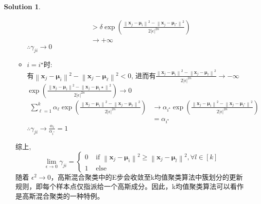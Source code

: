 \documentclass[a4paper,UTF8]{article}
\numberwithin{equation}{section}
\theoremstyle{definition}
\newtheorem*{solution}{Solution}
\begin{document}
\begin{solution}
\begin{enumerate}
\begin{itemize}
$$\begin{aligned}
    & >\delta \exp \left(\frac{\left\|\boldsymbol{x}_j-\boldsymbol{\mu}_i\right\|^2-\left\|\boldsymbol{x}_j-\boldsymbol{\mu}_{i^{\star}}\right\|^2}{2|\epsilon|^{2 n}}\right) \\
    & \rightarrow+\infty
    \end{aligned}
    $$
    $\therefore \gamma_{j i} \rightarrow 0$
    \item $i = i^{\star}$时: \\
    有$\left\|\boldsymbol{x}_j-\boldsymbol{\mu}_i\right\|^2-\left\|\boldsymbol{x}_j-\boldsymbol{\mu}_{\ell}\right\|^2<0$, 进而有$\frac{\left\|\boldsymbol{x}_j-\boldsymbol{\mu}_i\right\|^2-\left\|\boldsymbol{x}_j-\boldsymbol{\mu}_{\ell}\right\|^2}{2|\epsilon|^{2 n}} \rightarrow-\infty$ \\
    $\exp \left(\frac{\left\|\boldsymbol{x}_j-\boldsymbol{\mu}_i\right\|^2-\left\|\boldsymbol{x}_j-\boldsymbol{\mu}_i \star\right\|^2}{2|\epsilon|^{2 n}}\right) \rightarrow 0$
    $$
    \begin{aligned}
    \sum_{\ell=1}^k \alpha_{\ell} \exp \left(\frac{\left\|\boldsymbol{x}_j-\boldsymbol{\mu}_i\right\|^2-\left\|\boldsymbol{x}_j-\boldsymbol{\mu}_{\ell}\right\|^2}{2|\epsilon|^{2 n}}\right) & \rightarrow \alpha_{i^{\star}} \exp \left(\frac{\left\|\boldsymbol{x}_j-\boldsymbol{\mu}_i\right\|^2-\left\|\boldsymbol{x}_j-\boldsymbol{\mu}_{i^{\star}}\right\|^2}{2|\epsilon|^{2 n}}\right)\\
    & =\alpha_{i^{\star}}
    \end{aligned}
    $$
    $\therefore \gamma_{j i} \rightarrow \frac{\alpha_i}{\alpha_{i^*}}=1$
\end{itemize}
综上, 
$$\lim _{\epsilon \rightarrow 0} \gamma_{j i}= \begin{cases}0 & \text { if }\left\|\boldsymbol{x}_j-\boldsymbol{\mu}_i\right\|^2 \geq\left\|\boldsymbol{x}_j-\boldsymbol{\mu}_{l}\right\|^2, \forall l \in[k] \\ 1 & \text { else }\end{cases}$$
随着 $\epsilon^2 \rightarrow 0$，高斯混合聚类中的E步会收敛至k均值聚类算法中簇划分的更新规则，即每个样本点仅指派给一个高斯成分。因此，k均值聚类算法可以看作是高斯混合聚类的一种特例。


\end{enumerate}
\end{solution}
\end{document}
